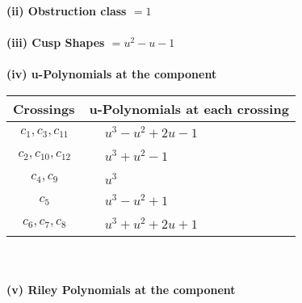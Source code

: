 \documentclass[1p]{elsarticle_modified}
\theoremstyle{definition}
\begin{document}
\flushleft \textbf{(ii) Obstruction class $= 1$}\\~\\
\flushleft \textbf{(iii) Cusp Shapes $= u^2- u-1$}\\~\\
\newpage\renewcommand{\arraystretch}{1}
\flushleft \textbf{(iv) u-Polynomials at the component}\newline \\
\begin{tabular}{m{50pt}|m{274pt}}
Crossings & \hspace{64pt}u-Polynomials at each crossing \\
\hline $$\begin{aligned}c_{1},c_{3},c_{11}\end{aligned}$$&$\begin{aligned}
&u^3- u^2+2 u-1
\end{aligned}$\\
\hline $$\begin{aligned}c_{2},c_{10},c_{12}\end{aligned}$$&$\begin{aligned}
&u^3+u^2-1
\end{aligned}$\\
\hline $$\begin{aligned}c_{4},c_{9}\end{aligned}$$&$\begin{aligned}
&u^3
\end{aligned}$\\
\hline $$\begin{aligned}c_{5}\end{aligned}$$&$\begin{aligned}
&u^3- u^2+1
\end{aligned}$\\
\hline $$\begin{aligned}c_{6},c_{7},c_{8}\end{aligned}$$&$\begin{aligned}
&u^3+u^2+2 u+1
\end{aligned}$\\
\hline
\end{tabular}\\~\\
\newpage\renewcommand{\arraystretch}{1}
\flushleft \textbf{(v) Riley Polynomials at the component}\newline \\
\end{document}
